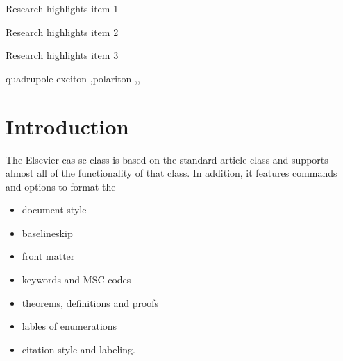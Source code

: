 \documentclass[a4paper,fleqn]{cas-sc}
\begin{document}


\begin{abstract}
This template helps you to create a properly formatted \LaTeX\ manuscript.

\noindent\texttt{\textbackslash begin{abstract}} \dots 
\texttt{\textbackslash end{abstract}} and
\verb+\begin{keyword}+ \verb+...+ \verb+\end{keyword}+ 
which
contain the abstract and keywords respectively. 
Each keyword shall be separated by a \verb+\sep+ command.
\end{abstract}

\begin{graphicalabstract}
\end{graphicalabstract}

\begin{highlights}
\item Research highlights item 1
\item Research highlights item 2
\item Research highlights item 3
\end{highlights}

\begin{keywords}
quadrupole exciton \sep polariton \sep \WGM \sep \BEC
\end{keywords}


\maketitle


\section{Introduction}

The Elsevier cas-sc class is based on the
standard article class and supports almost all of the functionality of
that class. In addition, it features commands and options to format the
\begin{itemize} \item document style \item baselineskip \item front
matter \item keywords and MSC codes \item theorems, definitions and
proofs \item lables of enumerations \item citation style and labeling.
\end{itemize}
\end{document}

